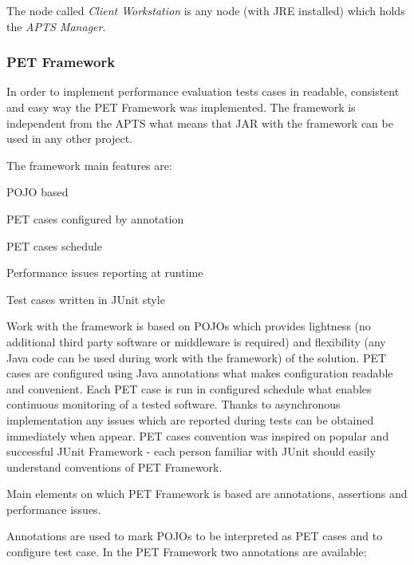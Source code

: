 \documentclass[10pt,a4paper]{article}
\let\tempone\itemize
\let\temptwo\enditemize
\renewenvironment{itemize}{\tempone\addtolength{\itemsep}{-0.4\baselineskip}}{\temptwo}
\begin{document}
The node called \textit{Client Workstation} is any node (with JRE installed) which holds the \textit{APTS Manager}. 


\subsubsection{PET Framework} \label{framework}
 
In order to implement performance evaluation tests cases in readable, consistent and easy way the PET Framework was implemented. The framework is independent from the APTS what means that JAR with the framework can be used in any other project. 

The framework main features are:
\begin{itemize}
\item POJO based
\item PET cases configured by annotation
\item PET cases schedule
\item Performance issues reporting at runtime 
\item Test cases written in JUnit \cite{junit} style
\end{itemize}

Work with the framework is based on POJOs which provides lightness (no additional third party software or middleware is required) and flexibility (any Java code can be used during work with the framework) of the solution. PET cases are  configured using Java annotations what makes configuration readable and convenient. Each PET case is run in configured schedule what enables continuous monitoring of a tested software. Thanks to asynchronous implementation any issues which are reported during tests can be obtained immediately when appear. PET cases convention was inspired on popular and successful JUnit Framework - each person familiar with JUnit should easily understand conventions of PET Framework.       

Main elements on which PET Framework is based are annotations, assertions and performance issues. 

Annotations are used to mark POJOs to be interpreted as PET cases and to configure test case. In the PET Framework two annotations are available:
\end{document}
